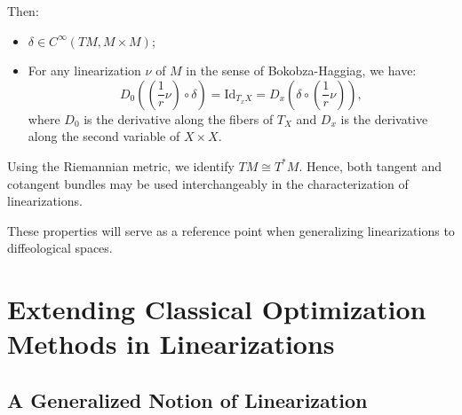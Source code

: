 \documentclass{amsart}
\newcounter{re}
\begin{document}
Then:
\begin{itemize}
	\item $\delta \in C^\infty(TM, M \times M)$;
	
	\item For any linearization $\nu$ of $M$ in the sense of Bokobza-Haggiag, we have:
	\[
	D_0\left(\left(\frac{1}{r}\nu\right) \circ \delta\right) = \mathrm{Id}_{T_x X} = D_x\left(\delta \circ \left(\frac{1}{r}\nu\right)\right),
	\]
    where $D_0$ is the derivative along the fibers of $T_X$ and $D_x$ is the derivative along the second variable of $X \times X.$
\end{itemize}

Using the Riemannian metric, we identify $TM \cong T^*M$. Hence, both tangent and cotangent bundles may be used interchangeably in the characterization of linearizations.

These properties will serve as a reference point when generalizing linearizations to diffeological spaces.
\section{Extending Classical Optimization Methods in Linearizations}
\subsection{A Generalized Notion of Linearization}
\end{document}
